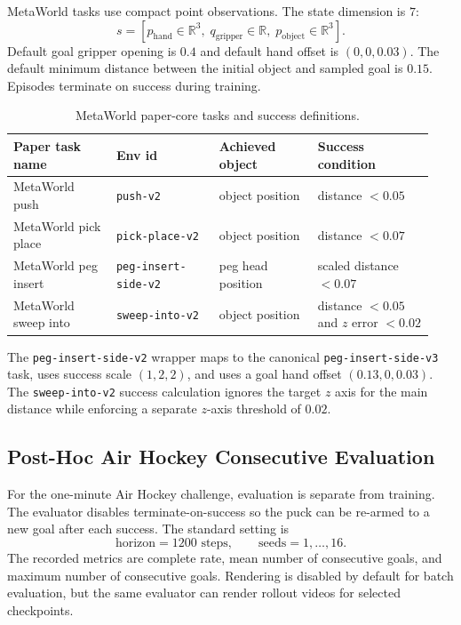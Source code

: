 MetaWorld tasks use compact point observations.  The state dimension is $7$:
\[
    s =
    [p_{\mathrm{hand}}\in\mathbb{R}^3,\;
      q_{\mathrm{gripper}}\in\mathbb{R},\;
      p_{\mathrm{object}}\in\mathbb{R}^3].
\]
Default goal gripper opening is $0.4$ and default hand offset is
$(0,0,0.03)$.  The default minimum distance
between the initial object and sampled goal is $0.15$.  Episodes terminate on
success during training.

\begin{table}[h]
\centering
\small
\setlength{\tabcolsep}{5pt}
\caption{MetaWorld paper-core tasks and success definitions.}
\label{tab:appendix-metaworld-tasks}
\begin{tabular}{p{0.23\linewidth}p{0.23\linewidth}p{0.22\linewidth}p{0.26\linewidth}}
\toprule
Paper task name & Env id & Achieved object & Success condition \\
\midrule
MetaWorld push & \texttt{push-v2} & object position & distance $<0.05$ \\
MetaWorld pick place & \texttt{pick-place-v2} & object position & distance $<0.07$ \\
MetaWorld peg insert & \texttt{peg-insert-side-v2} & peg head position & scaled distance $<0.07$ \\
MetaWorld sweep into & \texttt{sweep-into-v2} & object position & distance $<0.05$ and $z$ error $<0.02$ \\
\bottomrule
\end{tabular}
\end{table}

The \texttt{peg-insert-side-v2} wrapper maps to the canonical
\texttt{peg-insert-side-v3} task, uses success scale $(1,2,2)$, and uses a
goal hand offset $(0.13,0,0.03)$.  The \texttt{sweep-into-v2} success
calculation ignores the target $z$ axis for the main distance while enforcing a
separate $z$-axis threshold of $0.02$.

\subsection{Post-Hoc Air Hockey Consecutive Evaluation}

For the one-minute Air Hockey challenge, evaluation is separate from training.
The evaluator disables terminate-on-success so the puck can be re-armed to a
new goal after each success.  The standard setting is
\[
    \text{horizon}=1200\text{ steps},\qquad
    \text{seeds}=1,\ldots,16.
\]
The recorded metrics are complete rate, mean number of consecutive goals, and
maximum number of consecutive goals.  Rendering is disabled by default for
batch evaluation, but the same evaluator can render rollout videos for selected
checkpoints.


